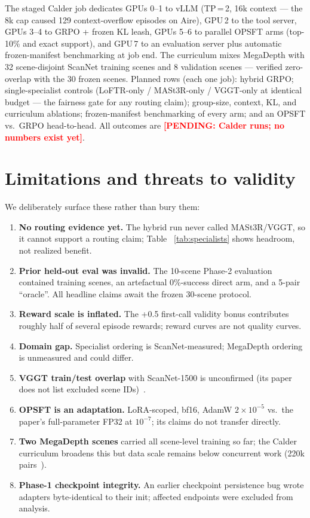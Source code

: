 \documentclass[10pt,twocolumn,letterpaper]{article}
\newcommand{\pending}[1]{\textcolor{red}{\textbf{[PENDING: #1]}}}
\begin{document}
The staged Calder job dedicates GPUs 0--1 to vLLM (TP\,=\,2, 16k context —
the 8k cap caused 129 context-overflow episodes on Aire), GPU\,2 to the
tool server, GPUs 3--4 to GRPO + frozen KL leash, GPUs 5--6 to parallel
OPSFT arms (top-10\% and exact support), and GPU\,7 to an evaluation
server plus automatic frozen-manifest benchmarking at job end. The
curriculum mixes MegaDepth with 32 scene-disjoint ScanNet training scenes
and 8 validation scenes — verified zero-overlap with the 30 frozen scenes.
Planned rows (each one job): hybrid GRPO; single-specialist controls
(LoFTR-only / MASt3R-only / VGGT-only at identical budget — the fairness
gate for any routing claim); group-size, context, KL, and curriculum
ablations; frozen-manifest benchmarking of every arm; and an OPSFT vs.\
GRPO head-to-head. All outcomes are \pending{Calder runs; no numbers
exist yet}.

\section{Limitations and threats to validity}
\label{sec:limitations}

We deliberately surface these rather than bury them:

\begin{enumerate}[leftmargin=1.4em,itemsep=2pt]
  \item \textbf{No routing evidence yet.} The hybrid run never called
  MASt3R/VGGT, so it cannot support a routing claim; Table~
  \ref{tab:specialists} shows headroom, not realized benefit.
  \item \textbf{Prior held-out eval was invalid.} The 10-scene Phase-2
  evaluation contained training scenes, an artefactual 0\%-success direct
  arm, and a 5-pair ``oracle''. All headline claims await the frozen
  30-scene protocol.
  \item \textbf{Reward scale is inflated.} The +0.5 first-call validity
  bonus contributes roughly half of several episode rewards; reward curves
  are not quality curves.
  \item \textbf{Domain gap.} Specialist ordering is ScanNet-measured;
  MegaDepth ordering is unmeasured and could differ.
  \item \textbf{VGGT train/test overlap} with ScanNet-1500 is unconfirmed
  (its paper does not list excluded scene IDs)~\cite{vggt}.
  \item \textbf{OPSFT is an adaptation.} LoRA-scoped, bf16, AdamW
  $2\!\times\!10^{-5}$ vs.\ the paper's full-parameter FP32 at
  $10^{-7}$; its claims do not transfer directly.
  \item \textbf{Two MegaDepth scenes} carried all scene-level training so
  far; the Calder curriculum broadens this but data scale remains below
  concurrent work (220k pairs~\cite{reasonmatch}).
  \item \textbf{Phase-1 checkpoint integrity.} An earlier checkpoint
  persistence bug wrote adapters byte-identical to their init; affected
  endpoints were excluded from analysis.
\end{enumerate}
\end{document}
